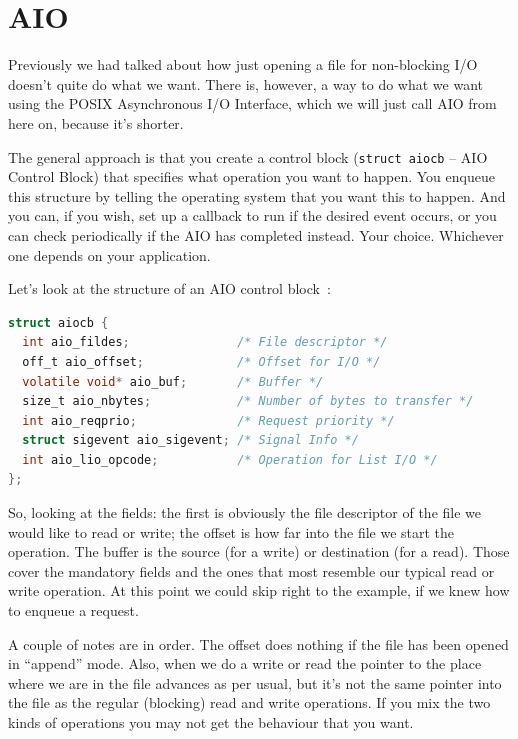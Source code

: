




\section*{AIO}
Previously we had talked about how just opening a file for non-blocking I/O doesn't quite do what we want. There is, however, a way to do what we want using the POSIX Asynchronous I/O Interface, which we will just call AIO from here on, because it's shorter.

The general approach is that you create a control block (\texttt{struct aiocb} -- AIO Control Block) that specifies what operation you want to happen. You enqueue this structure by telling the operating system that you want this to happen. And you can, if you wish, set up a callback to run if the desired event occurs, or you can check periodically if the AIO has completed instead. Your choice. Whichever one depends on your application.

Let's look at the structure of an AIO control block~\cite{apunix}:
\begin{lstlisting}[language=C]
struct aiocb {
  int aio_fildes;               /* File descriptor */
  off_t aio_offset;             /* Offset for I/O */
  volatile void* aio_buf;       /* Buffer */
  size_t aio_nbytes;            /* Number of bytes to transfer */
  int aio_reqprio;              /* Request priority */
  struct sigevent aio_sigevent; /* Signal Info */
  int aio_lio_opcode;           /* Operation for List I/O */
};
\end{lstlisting}

So, looking at the fields: the first is obviously the file descriptor of the file we would like to read or write; the offset is how far into the file we start the operation. The buffer is the source (for a write) or destination (for a read). Those cover the mandatory fields and the ones that most resemble our typical read or write operation. At this point we could skip right to the example, if we knew how to enqueue a request.

A couple of notes are in order. The offset does nothing if the file has been opened in ``append'' mode. Also, when we do a write or read the pointer to the place where we are in the file advances as per usual, but it's not the same pointer into the file as the regular (blocking) read and write operations. If you mix the two kinds of operations you may not get the behaviour that you want.

